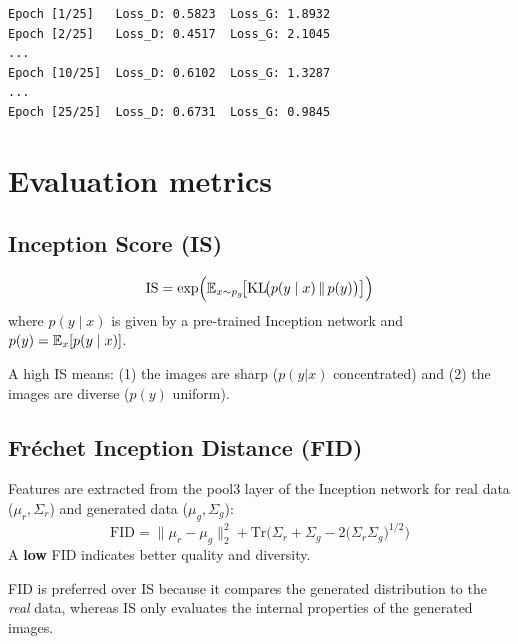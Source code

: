 \begin{codeoutput}
\begin{verbatim}
Epoch [1/25]   Loss_D: 0.5823  Loss_G: 1.8932
Epoch [2/25]   Loss_D: 0.4517  Loss_G: 2.1045
...
Epoch [10/25]  Loss_D: 0.6102  Loss_G: 1.3287
...
Epoch [25/25]  Loss_D: 0.6731  Loss_G: 0.9845
\end{verbatim}
\end{codeoutput}

\section{Evaluation metrics}
\label{sec:gan-metrics}

\subsection{Inception Score (IS)}

\begin{keyformulas}[title=\textbf{Inception Score}]
\begin{equation}
\text{IS} = \exp\!\Big(\mathbb{E}_{x \sim p_g}\!\big[\mathrm{KL}\!\big(p(y \mid x) \,\|\, p(y)\big)\big]\Big)
\end{equation}
where $p(y \mid x)$ is given by a pre-trained Inception network and $p(y) = \mathbb{E}_x[p(y \mid x)]$.

A high IS means: (1) the images are sharp ($p(y|x)$ concentrated) and (2) the images are diverse ($p(y)$ uniform).
\end{keyformulas}

\subsection{Fr\'echet Inception Distance (FID)}

\begin{keyformulas}[title=\textbf{Fr\'echet Inception Distance}]
Features are extracted from the pool3 layer of the Inception network for real data ($\mu_r, \Sigma_r$) and generated data ($\mu_g, \Sigma_g$):
\begin{equation}
\text{FID} = \|\mu_r - \mu_g\|_2^2 + \text{Tr}\!\Big(\Sigma_r + \Sigma_g - 2\big(\Sigma_r \Sigma_g\big)^{1/2}\Big)
\label{eq:fid}
\end{equation}
A \textbf{low} FID indicates better quality and diversity.
\end{keyformulas}

\begin{remark}
FID is preferred over IS because it compares the generated distribution to the \emph{real} data, whereas IS only evaluates the internal properties of the generated images.
\end{remark}

